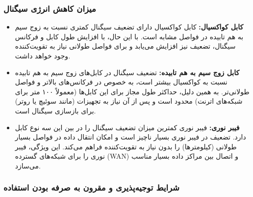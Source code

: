 \subsubsection*{میزان کاهش انرژی سیگنال}

\begin{itemize}
	\item \textbf{کابل کواکسیال:} کابل کواکسیال دارای تضعیف سیگنال کمتری نسبت به زوج سیم به هم تابیده در فواصل مشابه است. با این حال، با افزایش طول کابل و فرکانس سیگنال، تضعیف نیز افزایش می‌یابد و برای فواصل طولانی نیاز به تقویت‌کننده وجود خواهد داشت.

	\item \textbf{کابل زوج سیم به هم تابیده:} تضعیف سیگنال در کابل‌های زوج سیم به هم تابیده نسبت به کواکسیال بیشتر است، به خصوص در فرکانس‌های بالاتر و فواصل طولانی‌تر. به همین دلیل، حداکثر طول مجاز برای این کابل‌ها (معمولاً ۱۰۰ متر برای شبکه‌های اترنت) محدود است و پس از آن نیاز به تجهیزات (مانند سوئیچ یا روتر) برای بازسازی سیگنال است.

	\item \textbf{فیبر نوری:} فیبر نوری کمترین میزان تضعیف سیگنال را در بین این سه نوع کابل دارد. تضعیف در فیبر نوری بسیار ناچیز است و امکان انتقال داده در فواصل بسیار طولانی (کیلومترها) را بدون نیاز به تقویت‌کننده فراهم می‌کند. این ویژگی، فیبر نوری را برای شبکه‌های گسترده (WAN) و اتصال بین مراکز داده بسیار مناسب می‌سازد.
\end{itemize}

\subsubsection*{شرایط توجیه‌پذیری و مقرون به صرفه بودن استفاده}

